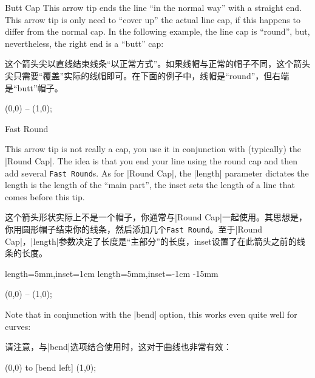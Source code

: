 \begin{arrowtipsimple}{Butt Cap}
    This arrow tip ends the line ``in the normal way'' with a straight end.
    This arrow tip is only need to ``cover up'' the actual line cap, if this
    happens to differ from the normal cap. In the following example, the line
    cap is ``round'', but, nevertheless, the right end is a ``butt'' cap:
    
    这个箭头尖以直线结束线条“以正常方式”。如果线帽与正常的帽子不同，这个箭头尖只需要“覆盖”实际的线帽即可。在下面的例子中，线帽是“round”，但右端是“butt”帽子。
\begin{codeexample}[preamble={\usetikzlibrary{arrows.meta}}]
\tikz \draw [line width=1ex, line cap=round, -Butt Cap] (0,0) -- (1,0);
\end{codeexample}
\end{arrowtipsimple}

\begin{arrowcap}{Fast Round}{
    This arrow tip is not really a cap, you use it in conjunction with
    (typically) the |Round Cap|. The idea is that you end your line using the
    round cap and then add several \texttt{Fast Round}s. As for |Round Cap|,
    the |length| parameter dictates the length is the length of the ``main
    part'', the inset sets the length of a line that comes before this tip.

    这个箭头形状实际上不是一个帽子，你通常与|Round Cap|一起使用。其思想是，你用圆形帽子结束你的线条，然后添加几个\texttt{Fast Round}。至于|Round Cap|，|length|参数决定了长度是“主部分”的长度，inset设置了在此箭头之前的线条的长度。
}%
{length=5mm,inset=1cm}%
{length=5mm,inset=-1cm}%
{-15mm}

\begin{codeexample}[preamble={\usetikzlibrary{arrows.meta}}]
\tikz \draw [line width=1ex,
             -{Round Cap []. Fast Round[] Fast Round[]}]
  (0,0) -- (1,0);
\end{codeexample}
    Note that in conjunction with the |bend| option, this works even quite well
    for curves:
    
    
    请注意，与|bend|选项结合使用时，这对于曲线也非常有效：
\begin{codeexample}[preamble={\usetikzlibrary{arrows.meta,bending}}]
\tikz [f/.tip = Fast Round] %
  \draw [line width=1ex, -{[bend] Round Cap[] . f f f}]
  (0,0) to [bend left] (1,0);
\end{codeexample}

    \begin{arrowcapexamples}
        \arrowcapexample[]
        \arrowcapexample[reversed]
        \arrowcapexample[cap angle=60]
        \arrowcapexample[cap angle=60,inset=5pt]
        \arrowcapexample[length=.5ex]
        \arrowcapexample[slant=.3]
    \end{arrowcapexamples}
\end{arrowcap}

